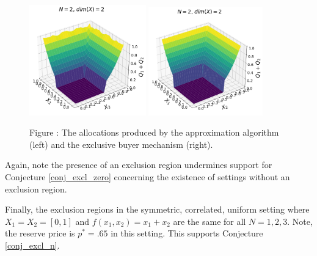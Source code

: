 \begin{figure}[H]
    \begin{center}
    \includegraphics[width=0.45\textwidth]{images/symmetric_correlated_unif.png}
    \includegraphics[width=0.44\textwidth]{images/symmetric_correlated_unif_ebm.png}
    \end{center}
    
    \vspace{1mm}
    \raggedright{\small {\sc Figure \thefig\label{fig:symmetric_correlated_alloc}:} The allocations produced by the approximation algorithm (left) and the exclusive buyer mechanism (right).} 
\end{figure}

\noindent Again, note the presence of an exclusion region undermines support for Conjecture \ref{conj_excl_zero} concerning the existence of settings without an exclusion region.

Finally, the exclusion regions in the symmetric, correlated, uniform setting where $X_1 = X_2 = [0,1]$ and $f(x_1,x_2) = x_1 + x_2$ are the same for all $N=1,2,3$. Note, the reserve price is $p^* = .65$ in this setting. This supports Conjecture \ref{conj_excl_n}.


